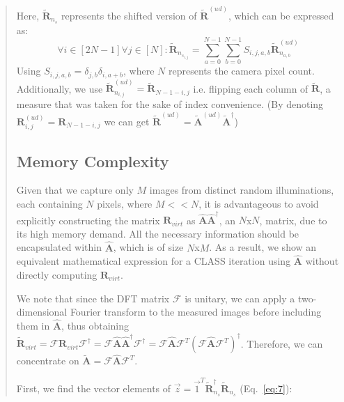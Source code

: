 \documentclass[12pt]{article}
\newenvironment{ourresponse}
    {\begin{tcolorbox}[width=\linewidth,breakable,enhanced,colback=gray!5,colframe=responsecolor!50,title=Response,left=5pt,right=5pt]}
    {\end{tcolorbox}}
\begin{document}
\begin{enumerate}[label=\arabic*.]
\begin{ourresponse}
\begin{quote}
            Here, $\tilde{\textbf{R}}_{n_s}$ represents the shifted version of $\tilde{\textbf{R}}^{(ud)}$, which can be expressed as:
            \begin{equation}
            \forall i\in[2N-1] \forall j\in[N]:
            \tilde{\textbf{R}}_{n_{s_{i,j}}}=\sum^{N-1}_{a=0}\sum^{N-1}_{b=0}S_{i,j,a,b}\tilde{\textbf{R}}^{(ud)}_{n_{a,b}}
            \tag{S8}
            \label{eq:8}
            \end{equation}
            Using $S_{i,j,a,b} = \delta_{j,b}\delta_{i,a+b}$, where $N$ represents the camera pixel count. Additionally, we use $\tilde{\textbf{R}}^{(ud)}_{n_{i,j}} = \tilde{\textbf{R}}_{N-1-i,j}$ i.e. flipping each column of $\tilde{\textbf{R}}$, a measure that was taken for the sake of index convenience.
            (By denoting $\textbf{R}^{(ud)}_{{i,j}} = \textbf{R}_{N-1-i,j}$ we can get $\tilde{\textbf{R}}^{(ud)} = \tilde{\textbf{A}}^{(ud)}\tilde{\textbf{A}}^\dagger$)
            
            
            
            \subsection*{Memory Complexity}
            Given that we capture only $M$ images from distinct random illuminations, each containing $N$ pixels, where $M<<N$, it is advantageous to avoid explicitly constructing the matrix $\textbf{R}_{virt}$ as ${\hat{\textbf{A}}}{\hat{\textbf{A}}}^{\dagger}$, an $N$x$N$, matrix, due to its high memory demand. All the necessary information should be encapsulated within $\hat{\textbf{A}}$, which is of size $N$x$M$. As a result, we show an equivalent mathematical expression for a CLASS iteration using $\hat{\textbf{A}}$ without directly computing $\textbf{R}_{virt}$.
            
            We note that since the DFT matrix \( \mathcal{F} \) is unitary, we can apply a two-dimensional Fourier transform to the measured images before including them in \( {\hat{\textbf{A}}} \), thus obtaining \( \tilde{\textbf{R}}_{virt} = \mathcal{F}\textbf{R}_{virt}\mathcal{F}^{\dagger} = \mathcal{F}{\hat{\textbf{A}}}{\hat{\textbf{A}}}^{\dagger}\mathcal{F}^{\dagger} = \mathcal{F}{\hat{\textbf{A}}}\mathcal{F}^T(\mathcal{F}{\hat{\textbf{A}}}\mathcal{F}^T)^{\dagger} \). Therefore, we can concentrate on $\tilde{\textbf{A}}=\mathcal{F}{\hat{\textbf{A}}}\mathcal{F}^{T}$.
            
            First, we find the vector elements of $\vec{z} = \vec{1}^T\tilde{\textbf{R}}^{\dagger}_{n_s}\tilde{\textbf{R}}_{n_s}$ (Eq.~\ref{eq:7}):
            

\end{quote}
\end{ourresponse}
\end{enumerate}
\end{document}
